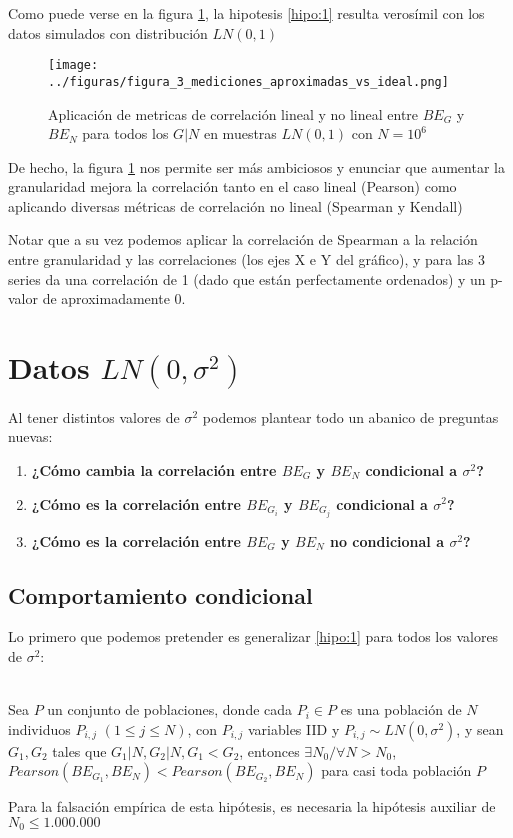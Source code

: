 Como puede verse en la figura \ref{fig:3}, la hipotesis \ref{hipo:1} resulta verosímil con los datos simulados con distribución $LN(0,1)$ 

\begin{figure}[H]
    \centering 
    \texttt{[image: ../figuras/figura\_3\_mediciones\_aproximadas\_vs\_ideal.png]} %
    \caption{Aplicación de metricas de correlación lineal y no lineal entre $BE_G$ y $BE_N$ para todos los $G | N$ en muestras $LN(0,1)$ con $N=10^6$}
    \label{fig:3}
\end{figure}

De hecho, la figura \ref{fig:3} nos permite ser más ambiciosos y enunciar que aumentar la granularidad mejora la correlación tanto en el caso lineal (Pearson) como aplicando diversas métricas de correlación no lineal (Spearman y Kendall)

Notar que a su vez podemos aplicar la correlación de Spearman a la relación entre granularidad y las correlaciones (los ejes X e Y del gráfico), y para las 3 series da una correlación de 1 (dado que están perfectamente ordenados) y un p-valor de aproximadamente 0.

\section{Datos $LN(0,\sigma^2)$}

Al tener distintos valores de $\sigma^2$ podemos plantear todo un abanico de preguntas nuevas:

\begin{enumerate}
    \item \textbf{¿Cómo cambia la correlación entre $BE_G$ y $BE_N$ condicional a $\sigma^2$?}
    \item \textbf{¿Cómo es la correlación entre $BE_{G_i}$ y $BE_{G_j}$ condicional a $\sigma^2$?}
    \item \textbf{¿Cómo es la correlación entre $BE_G$ y $BE_N$ no condicional a $\sigma^2$?}
\end{enumerate}

\subsection{Comportamiento condicional}

Lo primero que podemos pretender es generalizar \ref{hipo:1} para todos los valores de $\sigma^2$:

\begin{hipotesis}\label{hipo:2}
    \\
    Sea $P$ un conjunto de poblaciones, donde cada $P_i \in P$ es una población de $N$ individuos $P_{i,j}$ $(1 \leq j \leq N)$, con $P_{i,j}$ variables IID y $P_{i,j} \sim LN(0,\sigma^2)$, y sean $G_1, G_2$ tales que $G_1|N, G_2|N, G_1 < G_2$, entonces $\exists N_0 / \forall N > N_0 $, $Pearson(BE_{G_1},BE_N) < Pearson(BE_{G_2},BE_N)$ para casi toda población $P$
    
    Para la falsación empírica de esta hipótesis, es necesaria la hipótesis auxiliar de $N_0 \leq 1.000.000$  
\end{hipotesis}

